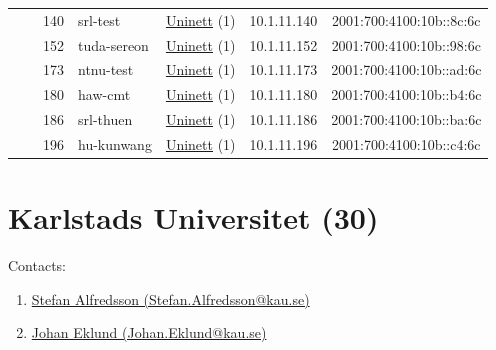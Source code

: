 \begin{small}
\begin{center}
\begin{longtable}{|c|c|c|c|c|c|c|c|}
  &  & \tiny{140} & \multicolumn{1}{|l|}{\tiny{srl-test}} & \multicolumn{2}{|c|}{\tiny{\href{https://www.uninett.no}{Uninett} (1)}} & \tiny{10.1.11.140} & \tiny{2001:700:4100:10b::8c:6c} \\* \cline{3-3}\cline{4-4}\cline{5-5}\cline{6-6}\cline{7-7}\cline{8-8}
  &  & \tiny{152} & \multicolumn{1}{|l|}{\tiny{tuda-sereon}} & \multicolumn{2}{|c|}{\tiny{\href{https://www.uninett.no}{Uninett} (1)}} & \tiny{10.1.11.152} & \tiny{2001:700:4100:10b::98:6c} \\* \cline{3-3}\cline{4-4}\cline{5-5}\cline{6-6}\cline{7-7}\cline{8-8}
  &  & \tiny{173} & \multicolumn{1}{|l|}{\tiny{ntnu-test}} & \multicolumn{2}{|c|}{\tiny{\href{https://www.uninett.no}{Uninett} (1)}} & \tiny{10.1.11.173} & \tiny{2001:700:4100:10b::ad:6c} \\* \cline{3-3}\cline{4-4}\cline{5-5}\cline{6-6}\cline{7-7}\cline{8-8}
  &  & \tiny{180} & \multicolumn{1}{|l|}{\tiny{haw-cmt}} & \multicolumn{2}{|c|}{\tiny{\href{https://www.uninett.no}{Uninett} (1)}} & \tiny{10.1.11.180} & \tiny{2001:700:4100:10b::b4:6c} \\* \cline{3-3}\cline{4-4}\cline{5-5}\cline{6-6}\cline{7-7}\cline{8-8}
  &  & \tiny{186} & \multicolumn{1}{|l|}{\tiny{srl-thuen}} & \multicolumn{2}{|c|}{\tiny{\href{https://www.uninett.no}{Uninett} (1)}} & \tiny{10.1.11.186} & \tiny{2001:700:4100:10b::ba:6c} \\* \cline{3-3}\cline{4-4}\cline{5-5}\cline{6-6}\cline{7-7}\cline{8-8}
  &  & \tiny{196} & \multicolumn{1}{|l|}{\tiny{hu-kunwang}} & \multicolumn{2}{|c|}{\tiny{\href{https://www.uninett.no}{Uninett} (1)}} & \tiny{10.1.11.196} & \tiny{2001:700:4100:10b::c4:6c} \\ \hline
\end{longtable}
\end{center}
\end{small}



\section{Karlstads Universitet (30)}
\label{sec:KAU}

Contacts:\begin{enumerate}
 \item {}\href{mailto:Stefan.Alfredsson@kau.se}{Stefan Alfredsson (Stefan.Alfredsson@kau.se)}
 \item {}\href{mailto:Johan.Eklund@kau.se}{Johan Eklund (Johan.Eklund@kau.se)}
\end{enumerate}

